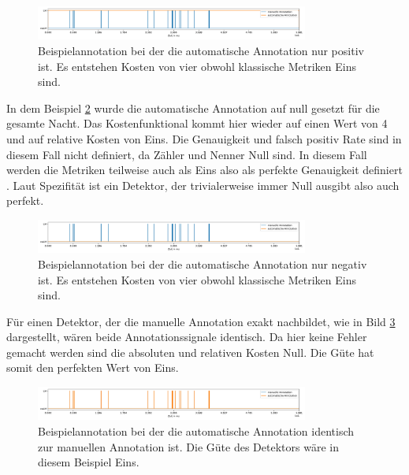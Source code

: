 \begin{figure}[!ht]%
	\begin{center}
	\includegraphics[width=0.80\textwidth]{./Bilder/customAll1.jpg}
	\end{center}
	\caption{Beispielannotation bei der die automatische Annotation nur positiv ist. Es entstehen Kosten von vier obwohl klassische Metriken Eins sind.}%
	\label{fig:all1}%
\end{figure}


In dem Beispiel \ref{fig:all0} wurde die automatische Annotation auf null gesetzt für die gesamte Nacht. Das Kostenfunktional kommt hier wieder auf einen Wert von 4 und auf relative Kosten von Eins. Die Genauigkeit und falsch positiv Rate sind in diesem Fall nicht definiert, da Zähler und Nenner Null sind. In diesem Fall werden die Metriken teilweise auch als Eins also als perfekte Genauigkeit definiert \cite{glassbox}. Laut Spezifität ist ein Detektor, der trivialerweise immer Null ausgibt also auch perfekt. 

\begin{figure}[!ht]%
	\begin{center}
	\includegraphics[width=0.80\textwidth]{./Bilder/AllZero.jpg}
	\end{center}
	\caption{Beispielannotation bei der die automatische Annotation nur negativ ist. Es entstehen Kosten von vier obwohl klassische Metriken Eins sind.}%
	\label{fig:all0}%
\end{figure}

Für einen Detektor, der die manuelle Annotation exakt nachbildet, wie in Bild \ref{fig:same} dargestellt, wären beide Annotationssignale identisch. Da hier keine Fehler gemacht werden sind die absoluten und relativen Kosten Null. Die Güte hat somit den perfekten Wert von Eins.

\begin{figure}[!ht]%
	\begin{center}
	\includegraphics[width=0.80\textwidth]{./Bilder/aAnno=mAnno.jpg}
	\end{center}
	\caption{Beispielannotation bei der die automatische Annotation identisch zur manuellen Annotation ist. Die Güte des Detektors wäre in diesem Beispiel Eins.}%
	\label{fig:same}%
\end{figure}

